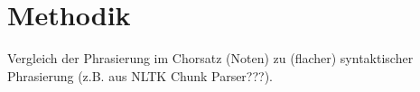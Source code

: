 \chapter{Methodik}
\label{chap:Methodik}
\pagestyle{plain}

Vergleich der Phrasierung im Chorsatz (Noten) zu (flacher) syntaktischer Phrasierung (z.B. aus NLTK Chunk Parser???).